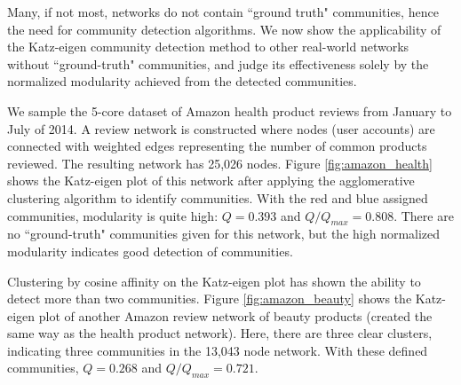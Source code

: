 \documentclass{IEEEtran}
\begin{document}
	
	
	Many, if not most, networks do not contain ``ground truth" communities, hence the need for community detection algorithms. We now show the applicability of the Katz-eigen community detection method to other real-world networks without ``ground-truth" communities, and judge its effectiveness solely by the normalized modularity achieved from the detected communities.
	
	We sample the 5-core dataset of Amazon health product reviews\cite{amazon} from January to July of 2014. A review network is constructed where nodes (user accounts) are connected with weighted edges representing the number of common products reviewed. The resulting network has 25,026 nodes. Figure \ref{fig:amazon_health} shows the Katz-eigen plot of this network after applying the agglomerative clustering algorithm to identify communities. With the red and blue assigned communities, modularity is quite high: $Q=0.393$ and $Q/Q_{max}=0.808$. There are no ``ground-truth" communities given for this network, but the high normalized modularity indicates good detection of communities.
	
	Clustering by cosine affinity on the Katz-eigen plot has shown the ability to detect more than two communities. Figure \ref{fig:amazon_beauty} shows the Katz-eigen plot of another Amazon review network of beauty products (created the same way as the health product network). Here, there are three clear clusters, indicating three communities in the 13,043 node network. With these defined communities, $Q=0.268$ and $Q/Q_{max}=0.721$.
	
\end{document}
